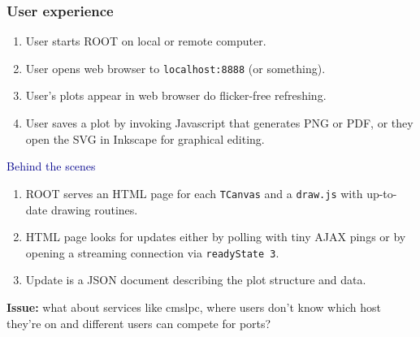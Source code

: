 \documentclass[compress]{beamer}
\begin{document}
\begin{frame}
\frametitle{User experience}
\begin{enumerate}
\item User starts ROOT on local or remote computer.
\item User opens web browser to {\tt localhost:8888} (or something).
\item User's plots appear in web browser do flicker-free refreshing.
\item User saves a plot by invoking Javascript that generates PNG or PDF, or they open the SVG in Inkscape for graphical editing.
\end{enumerate}

\vfill
\hspace{-0.83 cm} \textcolor{darkblue}{\Large Behind the scenes}

\begin{enumerate}
\item ROOT serves an HTML page for each {\tt TCanvas} and a {\tt draw.js} with up-to-date drawing routines.
\item HTML page looks for updates either by polling with tiny AJAX pings or by opening a streaming connection via {\tt readyState 3}.
\item Update is a JSON document describing the plot structure and data.
\end{enumerate}

\vfill
{\bf Issue:} what about services like cmslpc, where users don't know which host they're on and different users can compete for ports?
\end{frame}
\end{document}
